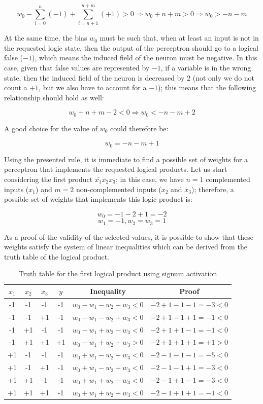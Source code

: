 \documentclass[letterpaper,headings=standardclasses]{scrartcl}
\begin{document}
$$ w_0 - \sum_{i = 0}^{n} (-1) + \sum_{i = n+1}^{n+m} (+1) > 0 \Rightarrow w_0 + n + m > 0 \Rightarrow w_0 > - n - m $$

At the same time, the bias $w_0$ must be such that, when at least an input is not in the requested logic state, then the output of the perceptron should go to a logical false ($-1$), which means the induced field of the neuron must be negative. In this case, given that false values are represented by $-1$, if a variable is in the wrong state, then the induced field of the neuron is decreased by $2$ (not only we do not count a $+1$, but we also have to account for a $-1$); this means that the following relationship should hold as well:

$$ w_0 + n + m - 2 < 0 \Rightarrow w_0 < - n - m  + 2$$

A good choice for the value of $w_0$ could therefore be:

$$ w_0 = - n - m + 1 $$

Using the presented rule, it is immediate to find a possible set of weights for a perceptron that implements the requested logical products. Let us start considering the first product $\bar{x_1} x_2 x_3$; in this case, we have $n=1$ complemented inputs ($x_1$) and $m=2$ non-complemented inputs ($x_2$ and $x_3$); therefore, a possible set of weights that implements this logic product is:

$$ w_0 = -1 -2 + 1 = -2 $$
$$ w_1 = -1, w_2 = w_3 = 1 $$

As a proof of the validity of the selected values, it is possible to show that these weights satisfy the system of linear inequalities which can be derived from the truth table of the logical product.

\begin{table}[h]
\centering
\begin{tabular}{|c|c|c|c|c|c|}
\hline
$x_1$ & $x_2$ & $x_3$ & $y$ & Inequality & Proof \\ \hline
-1    & -1    & -1    & -1  & $w_0-w_1-w_2-w_3<0$ & $-2+1-1-1=-3<0$ \\ \hline
-1    & -1    & +1    & -1  & $w_0-w_1-w_2+w_3<0$ & $-2+1-1+1=-1<0$ \\ \hline
-1    & +1    & -1    & -1  & $w_0-w_1+w_2-w_3<0$ & $-2+1+1-1=-1<0$ \\ \hline
-1    & +1    & +1    & +1  & $w_0-w_1+w_2+w_3>0$ & $-2+1+1+1=+1>0$ \\ \hline
+1    & -1    & -1    & -1  & $w_0+w_1-w_2-w_3<0$ & $-2-1-1-1=-5<0$ \\ \hline
+1    & -1    & +1    & -1  & $w_0+w_1-w_2+w_3<0$ & $-2-1-1+1=-3<0$ \\ \hline
+1    & +1    & -1    & -1  & $w_0+w_1+w_2-w_3<0$ & $-2-1+1-1=-3<0$ \\ \hline
+1    & +1    & +1    & -1  & $w_0+w_1+w_2+w_3<0$ & $-2-1+1+1=-1<0$ \\ \hline
\end{tabular}
\caption{Truth table for the first logical product using signum activation}
\label{truth_prod1}
\end{table}
\end{document}

